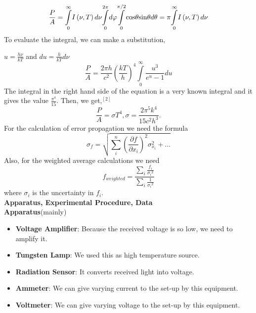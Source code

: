 \documentclass[11pt,a4paper]{article}
\begin{document}
{\begin{equation}
	    \frac{P}{A}=\underset{0}{\overset{\infty }{\int }}I\left(\nu ,T\right)d\nu \underset{0}{\overset{2\pi }{\int }}d\varphi \underset{0}{\overset{\pi/2}{\int }}{\mathrm{cos}}\theta \mathrm{sin}\theta d\theta \\= \pi\underset{0}{\overset{\infty }{\int }}I\left(\nu ,T\right)d\nu
	    \end{equation} 
	    To evaluate the integral, we can make a substitution,
	    \par $u=\frac{h\nu}{kT}$ and $du=\frac{h}{kT}d\nu$
	    \begin{equation}
	    \frac{P}{A}=\frac{2\pi h}{{c}^{2}}{\left(\frac{kT}{h}\right)}^{4}\underset{0}{\overset{\infty }{\int }}\frac{{u}^{3}}{{e}^{u}-1}du
	    \end{equation}
	    The integral in the right hand side of the equation is a very known integral and it gives the value $\frac {\pi^4}{15}$. Then, we get,$^{[2]}$
	    \begin{equation}
	    \frac{P}{A}=\sigma T^4, \sigma=\frac{2\pi^5k^4}{15c^2h^3}.
	    \end{equation}
	    For the calculation of error propagation we need the formula
	    \begin{equation}
	    {\sigma }_{f}=\sqrt{\sum _{i}^{n}{\left(\frac{\partial f}{\partial {x}_{i}}\right)}^{2}{\sigma }_{{x}_{i}}^{2}+\dots }
	    \end{equation}
	    Also, for the weighted average calculations we need
	    \begin{equation}
	    f_{weighted}=\frac{\sum _{i}\frac{{f}_{i}}{{\sigma_i }^{2}}}{\sum _{i}\frac{1}{{\sigma_i }^{2}}}
	    \end{equation}
	    where $\sigma_i$ is the uncertainty in $f_i$. \\[\baselineskip]
	    \textbf{Apparatus, Experimental Procedure, Data}
	    \\[\baselineskip] \textbf{\small{Apparatus}}(mainly)
	    \begin{itemize}
	    \item \textbf{Voltage Amplifier}: Because the received voltage is so low, we need to amplify it.
	    \item \textbf{Tungsten Lamp}: We used this as high temperature source.
	    \item \textbf{Radiation Sensor}: It converts received light into voltage.
	    \item \textbf{Ammeter}: We can give varying current to the set-up by this equipment.
	    \item \textbf{Voltmeter}: We can give varying voltage to the set-up by this equipment.

\end{itemize}}
\end{document}
